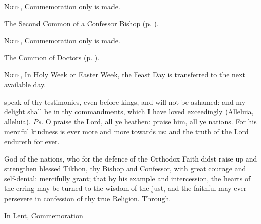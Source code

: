 
\begin{rubric}
	\textsc{Note,} Commemoration only is made.
\end{rubric}

\begin{rubric}
	The Second Common of a Confessor Bishop (p. \pageref{CommonConfessorBishopII}).
\end{rubric}



\begin{rubric}
	\textsc{Note,} Commemoration only is made.
\end{rubric}

\begin{rubric}
	The Common of Doctors (p. \pageref{CommonDoctors}).
\end{rubric}


\clearpage
{}

\begin{rubric}
	\textsc{Note,} In Holy Week or Easter Week, the Feast Day is transferred to the next available day.
\end{rubric}

\introit
{} speak of thy testimonies, even before kings, and will not be ashamed: and my delight shall be in thy commandments, which I have loved exceedingly (Alleluia, alleluia). \textit{Ps.} O praise the Lord, all ye heathen: praise him, all ye nations. For his merciful kindness is ever more and more towards us: and the truth of the Lord endureth for ever.

\collect
 God of the nations, who for the defence of the Orthodox Faith didst raise up and strengthen blessed Tikhon, thy Bishop and Confessor, with great courage and self-denial: mercifully grant; that by his example and intercession, the hearts of the erring may be turned to the wisdom of the just, and the faithful may ever persevere in confession of thy true Religion. Through.
\begin{rubric}
    In Lent, Commemoration %
\end{rubric}

